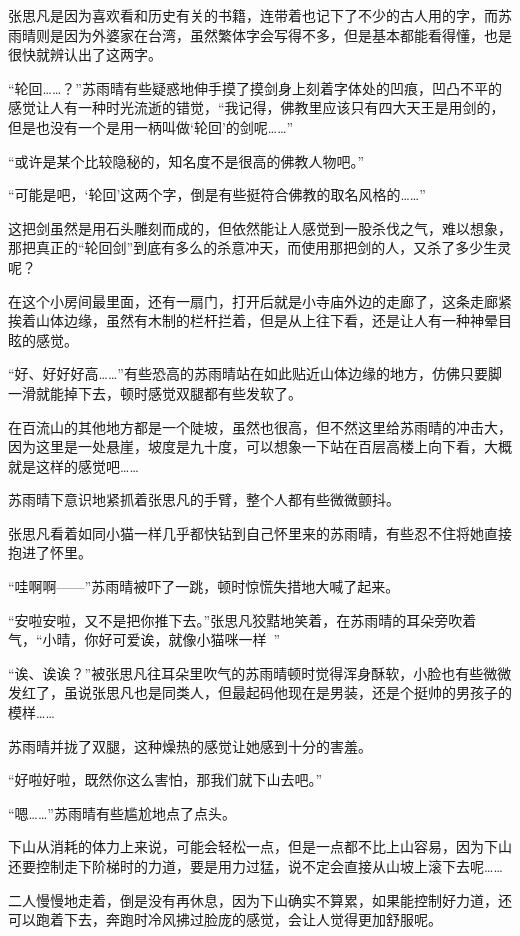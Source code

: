 张思凡是因为喜欢看和历史有关的书籍，连带着也记下了不少的古人用的字，而苏雨晴则是因为外婆家在台湾，虽然繁体字会写得不多，但是基本都能看得懂，也是很快就辨认出了这两字。

“轮回……？”苏雨晴有些疑惑地伸手摸了摸剑身上刻着字体处的凹痕，凹凸不平的感觉让人有一种时光流逝的错觉，“我记得，佛教里应该只有四大天王是用剑的，但是也没有一个是用一柄叫做‘轮回’的剑呢……”

“或许是某个比较隐秘的，知名度不是很高的佛教人物吧。”

“可能是吧，‘轮回’这两个字，倒是有些挺符合佛教的取名风格的……”

这把剑虽然是用石头雕刻而成的，但依然能让人感觉到一股杀伐之气，难以想象，那把真正的“轮回剑”到底有多么的杀意冲天，而使用那把剑的人，又杀了多少生灵呢？

在这个小房间最里面，还有一扇门，打开后就是小寺庙外边的走廊了，这条走廊紧挨着山体边缘，虽然有木制的栏杆拦着，但是从上往下看，还是让人有一种神晕目眩的感觉。

“好、好好好高……”有些恐高的苏雨晴站在如此贴近山体边缘的地方，仿佛只要脚一滑就能掉下去，顿时感觉双腿都有些发软了。

在百流山的其他地方都是一个陡坡，虽然也很高，但不然这里给苏雨晴的冲击大，因为这里是一处悬崖，坡度是九十度，可以想象一下站在百层高楼上向下看，大概就是这样的感觉吧……

苏雨晴下意识地紧抓着张思凡的手臂，整个人都有些微微颤抖。

张思凡看着如同小猫一样几乎都快钻到自己怀里来的苏雨晴，有些忍不住将她直接抱进了怀里。

“哇啊啊——”苏雨晴被吓了一跳，顿时惊慌失措地大喊了起来。

“安啦安啦，又不是把你推下去。”张思凡狡黠地笑着，在苏雨晴的耳朵旁吹着气，“小晴，你好可爱诶，就像小猫咪一样~”

“诶、诶诶？”被张思凡往耳朵里吹气的苏雨晴顿时觉得浑身酥软，小脸也有些微微发红了，虽说张思凡也是同类人，但最起码他现在是男装，还是个挺帅的男孩子的模样……

苏雨晴并拢了双腿，这种燥热的感觉让她感到十分的害羞。

“好啦好啦，既然你这么害怕，那我们就下山去吧。”

“嗯……”苏雨晴有些尴尬地点了点头。

下山从消耗的体力上来说，可能会轻松一点，但是一点都不比上山容易，因为下山还要控制走下阶梯时的力道，要是用力过猛，说不定会直接从山坡上滚下去呢……

二人慢慢地走着，倒是没有再休息，因为下山确实不算累，如果能控制好力道，还可以跑着下去，奔跑时冷风拂过脸庞的感觉，会让人觉得更加舒服呢。

